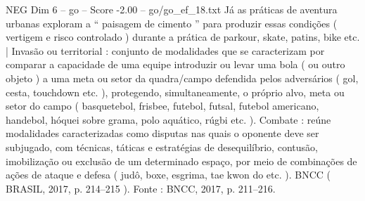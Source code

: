 \begin{textsample}{NEG Dim 6 – go – Score -2.00 – go/go\_ef\_18.txt}
Já as práticas de aventura urbanas exploram a “ paisagem de cimento ” para produzir essas condições ( vertigem e risco controlado ) durante a prática de parkour, skate, patins, bike etc. | Invasão ou territorial : conjunto de modalidades que se caracterizam por comparar a capacidade de uma equipe introduzir ou levar uma bola ( ou outro objeto ) a uma meta ou setor da quadra/campo defendida pelos adversários ( gol, cesta, touchdown etc. ), protegendo, simultaneamente, o próprio alvo, meta ou setor do campo ( basquetebol, frisbee, futebol, futsal, futebol americano, handebol, hóquei sobre grama, polo aquático, rúgbi etc. ).
Combate : reúne modalidades caracterizadas como disputas nas quais o oponente deve ser subjugado, com técnicas, táticas e estratégias de desequilíbrio, contusão, imobilização ou exclusão de um determinado espaço, por meio de combinações de ações de ataque e defesa ( judô, boxe, esgrima, tae kwon do etc. ).
BNCC ( BRASIL, 2017, p. 214–215 ).
Fonte : BNCC, 2017, p. 211–216.

\end{textsample}
